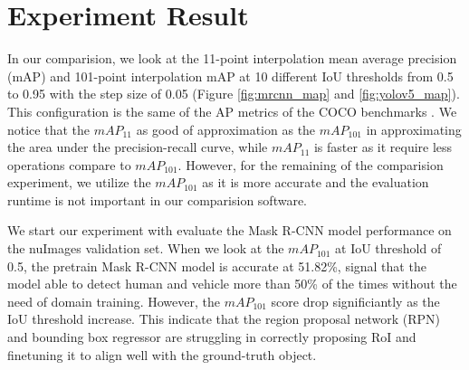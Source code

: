 \section{Experiment Result}  \label{sec:experiment_result}

In our comparision, we look at the 11-point interpolation mean average precision (mAP) and 101-point interpolation mAP at 10 different IoU thresholds from 0.5 to 0.95 with the step size of 0.05 (Figure \ref{fig:mrcnn_map} and \ref{fig:yolov5_map}). This configuration is the same of the AP metrics of the COCO benchmarks \cite{coco_2014}. We notice that the $mAP_{11}$ as good of approximation as the $mAP_{101}$ in approximating the area under the precision-recall curve, while $mAP_{11}$ is faster as it require less operations compare to $mAP_{101}$. However, for the remaining of the comparision experiment, we utilize the $mAP_{101}$ as it is more accurate and the evaluation runtime is not important in our comparision software.

We start our experiment with evaluate the Mask R-CNN model performance on the nuImages validation set. When we look at the $mAP_{101}$ at IoU threshold of 0.5, the pretrain Mask R-CNN model is accurate at 51.82\%, signal that the model able to detect human and vehicle more than 50\% of the times without the need of domain training. However, the $mAP_{101}$ score drop significiantly as the IoU threshold increase. This indicate that the region proposal network (RPN) and bounding box regressor are struggling in correctly proposing RoI and finetuning it to align well with the ground-truth object.

